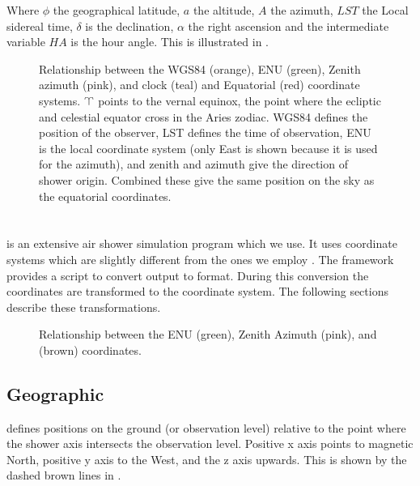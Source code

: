 Where $\phi$ the geographical latitude, $a$ the altitude, $A$ the
azimuth, $\mathit{LST}$ the Local sidereal time, $\delta$ is the
declination, $\alpha$ the right ascension and the intermediate variable
$\mathit{HA}$ is the hour angle. This is illustrated in
.


\begin{figure}
    \centering
    
    \caption{Relationship between the WGS84 (orange), ENU (green),
             Zenith azimuth (pink), and clock (teal) and Equatorial
             (red) coordinate systems. $\vernal$ points to the vernal
             equinox, the point where the ecliptic and celestial equator
             cross in the Aries zodiac. WGS84 defines the position of
             the observer, LST defines the time of observation, ENU is
             the local coordinate system (only East is shown because it
             is used for the azimuth), and zenith and azimuth give the
             direction of shower origin. Combined these give the same
             position on the sky as the equatorial coordinates.}
    \label{fig:wgs84_zenazi_lst_equatorial}
\end{figure}


\section{\corsika}
\label{sec:corsika}

\corsika is an extensive air shower simulation program which we use. It
uses coordinate systems which are slightly different from the ones we
employ \cite{heck:2013aa}. The \sapphire framework provides a script to
convert \corsika output to \hdf format. During this conversion the
coordinates are transformed to the \hisparc coordinate system. The
following sections describe these transformations.

\begin{figure}
    \centering
    
    \caption{Relationship between the ENU (green), Zenith Azimuth (pink),
             and \corsika (brown) coordinates.}
    \label{fig:enu_corsika}
\end{figure}


\subsection{Geographic}

\corsika defines positions on the ground (or observation level) relative
to the point where the shower axis intersects the observation level.
Positive x axis points to magnetic North, positive y axis to the West,
and the z axis upwards. This is shown by the dashed brown lines in
.

